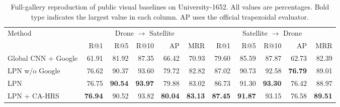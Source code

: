 \begin{table}[!t]
\centering
\small
\caption{Full-gallery reproduction of public visual baselines on
University-1652. All values are percentages. Bold type indicates the
largest value in each column. AP uses the official trapezoidal evaluator.}
\label{tab:formal-baseline-exact}
\setlength{\tabcolsep}{3.5pt}
\renewcommand{\arraystretch}{1.12}
\begin{tabular}{lrrrrrrrrrr}
\toprule
\multirow{2}{*}{Method}
& \multicolumn{5}{c}{Drone $\rightarrow$ Satellite}
& \multicolumn{5}{c}{Satellite $\rightarrow$ Drone} \\
\cmidrule(lr){2-6}\cmidrule(lr){7-11}
& R@1 & R@5 & R@10 & AP & MRR
& R@1 & R@5 & R@10 & AP & MRR \\
\midrule
Global CNN + Google & 61.91 & 81.92 & 87.35 & 66.42 & 70.93
& 79.60 & 85.59 & 87.87 & 62.73 & 82.39 \\
LPN w/o Google & 76.62 & 90.37 & 93.60 & 79.72 & 82.82
& 87.02 & 90.73 & 92.58 & \textbf{76.79} & 89.01 \\
LPN & 76.75 & \textbf{90.54} & \textbf{93.97} & 79.88 & 83.02
& 86.73 & 91.30 & \textbf{93.30} & 76.42 & 88.97 \\
LPN + CA-HRS & \textbf{76.94} & 90.52 & 93.82 & \textbf{80.04} & \textbf{83.13}
& \textbf{87.45} & \textbf{91.87} & 93.15 & 76.58 & \textbf{89.51} \\
\bottomrule
\end{tabular}
\end{table}
